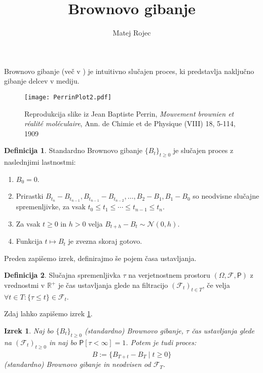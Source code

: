 \documentclass[11pt]{article}
\title{Brownovo gibanje}
\author{Matej Rojec}
\date{}
\newcommand{\f}{\mathcal{F}}
\theoremstyle{plain}
\newtheorem{izrek}{Izrek}
\theoremstyle{definition}
\newtheorem{definicija}{Definicija}
\begin{document}
\maketitle

Brownovo gibanje (več v \cite{karatzas1991brownian}) je intuitivno slučajen proces,
ki predstavlja naključno gibanje delcev v mediju.
    
    \begin{figure}[!ht]
        \centering
        \texttt{[image: PerrinPlot2.pdf]}
        \caption{Reprodukcija slike iz Jean Baptiste Perrin, \emph{Mouvement brownien et réalité moléculaire}, Ann. de Chimie et de Physique (VIII) 18, 5-114, 1909}
    \end{figure}
    
    \begin{definicija}
        Standardno Brownovo gibanje $\{B_t\}_{t \geq 0}$ je slučajen proces z naslednjimi lastnostmi: 
            \begin{enumerate}
                \item $B_0 = 0$.
                \item Prirastki $B_{t_n} - B_{t_{n-1}}, B_{t_{n-1}} - B_{t_{n-2}}, \ldots, B_2 - B_1, B_1 - B_0$ so neodvisne slučajne spremenljivke, za vsak $t_0 \leq t_1 \leq \cdots \leq t_{n-1} \leq t_n$.
                \item Za vsak $t \geq 0$ in $h > 0$ velja $B_{t+h} - B_t \sim \mathcal{N}(0, h)$.
                \item Funkcija $t \mapsto B_t$ je zvezna skoraj gotovo.
            \end{enumerate}
    \end{definicija}
    
    Preden zapišemo izrek, definirajmo še pojem časa ustavljanja.
    
    \begin{definicija}
        Slučajna spremenljivka $\tau$ na verjetnostnem prostoru $(\Omega ,\f,\mathsf{P})$ z vrednostmi v $\mathbb{R}^+$
        je čas ustavljanja glede na filtracijo $(\f_t)_{t\in T}$, če velja $\forall t\in T: \{\tau \leq t\}\in \f_t$.
    \end{definicija}
    
    Zdaj lahko zapišemo izrek \ref{thm:stopped_brownian}.
    
    \begin{izrek}
        \label{thm:stopped_brownian}
        Naj bo $\{B_t\}_{t \geq 0}$ (standardno) Brownovo gibanje, $\tau$ čas ustavljanja glede na 
        $(\f_t)_{t \geq 0}$ in naj bo $\mathsf{P}[\tau<\infty] = 1$.
        Potem je tudi proces:
        \[
        \hat{B} := \{B_{T+t} - B_T \mid t \geq 0\}
        \]
        (standardno) Brownovo gibanje in neodvisen od $\f_T$.
    \end{izrek}

    
    
    
\end{document}

